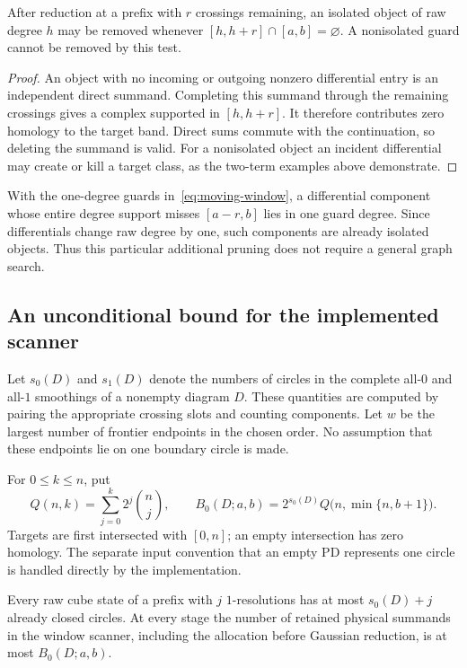 \begin{lemma}
\label{lem:isolated-window-guards}
After reduction at a prefix with $r$ crossings remaining, an isolated
object of raw degree $h$ may be removed whenever
$[h,h+r]\cap[a,b]=\varnothing$.  A nonisolated guard cannot be removed by
this test.
\end{lemma}

\begin{proof}
An object with no incoming or outgoing nonzero differential entry is an
independent direct summand.  Completing this summand through the remaining
crossings gives a complex supported in $[h,h+r]$.  It therefore contributes
zero homology to the target band.  Direct sums commute with the
continuation, so deleting the summand is valid.  For a nonisolated object
an incident differential may create or kill a target class, as the
two-term examples above demonstrate.
\end{proof}

With the one-degree guards in~\eqref{eq:moving-window}, a differential
component whose entire degree support misses $[a-r,b]$ lies in one guard
degree.  Since differentials change raw degree by one, such components
are already isolated objects.  Thus this particular additional pruning
does not require a general graph search.

\subsection{An unconditional bound for the implemented scanner}

Let $s_0(D)$ and $s_1(D)$ denote the numbers of circles in the complete
all-$0$ and all-$1$ smoothings of a nonempty diagram $D$.  These quantities
are computed by pairing the appropriate crossing slots and counting
components.  Let $w$ be the largest number of frontier endpoints in the
chosen order.  No assumption that these endpoints lie on one boundary
circle is made.

For $0\leq k\leq n$, put
\begin{equation}
 Q(n,k)=\sum_{j=0}^{k}2^j\binom{n}{j},\qquad
 B_0(D;a,b)=2^{s_0(D)}Q\bigl(n,\min\{n,b+1\}\bigr).
 \label{eq:elementary-window-bound}
\end{equation}
Targets are first intersected with $[0,n]$; an empty intersection has zero
homology.  The separate input convention that an empty PD represents one
circle is handled directly by the implementation.

\begin{lemma}
\label{lem:window-circle-count}
Every raw cube state of a prefix with $j$ $1$-resolutions has at most
$s_0(D)+j$ already closed circles.  At every stage the number of retained
physical summands in the window scanner, including the allocation before
Gaussian reduction, is at most $B_0(D;a,b)$.
\end{lemma}

